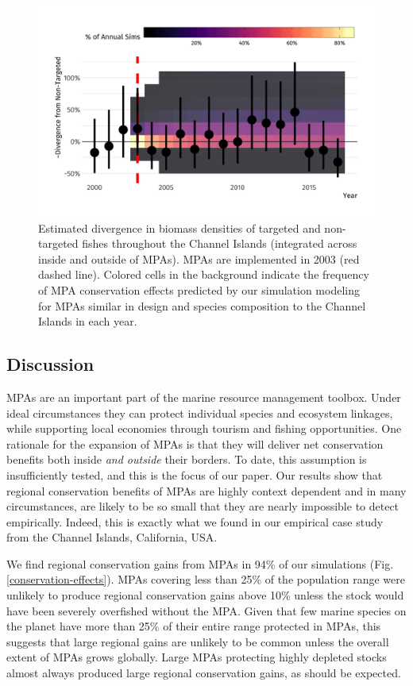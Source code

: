 \documentclass[9pt,twocolumn,twoside,lineno]{pnas-new}
\begin{document}
\begin{figure}%
  \centering
  \includegraphics[width=1\linewidth]{figs/did_plot.png}
  \caption{Estimated divergence in biomass densities of targeted and non-targeted fishes throughout the Channel Islands (integrated across inside and outside of MPAs). MPAs are implemented in 2003 (red dashed line). Colored cells in the background indicate the frequency of MPA conservation effects predicted by our simulation modeling for MPAs similar in design and species composition to the Channel Islands in each year.}
  \label{did-plot}
\end{figure}

\hypertarget{discussion}{%
\subsection*{Discussion}\label{discussion}}

MPAs are an important part of the marine resource management toolbox.
Under ideal circumstances they can protect individual species and
ecosystem linkages, while supporting local economies through tourism and
fishing opportunities. One rationale for the expansion of MPAs is that
they will deliver net conservation benefits both inside \emph{and
outside} their borders. To date, this assumption is insufficiently
tested, and this is the focus of our paper. Our results show that
regional conservation benefits of MPAs are highly context dependent and
in many circumstances, are likely to be so small that they are nearly
impossible to detect empirically. Indeed, this is exactly what we found
in our empirical case study from the Channel Islands, California, USA.

We find regional conservation gains from MPAs in 94\% of our simulations
(Fig.\ref{conservation-effects}). MPAs covering less than 25\% of the
population range were unlikely to produce regional conservation gains
above 10\% unless the stock would have been severely overfished without
the MPA. Given that few marine species on the planet have more than 25\%
of their entire range protected in MPAs, this suggests that large
regional gains are unlikely to be common unless the overall extent of
MPAs grows globally. Large MPAs protecting highly depleted stocks almost
always produced large regional conservation gains, as should be
expected.
\end{document}

